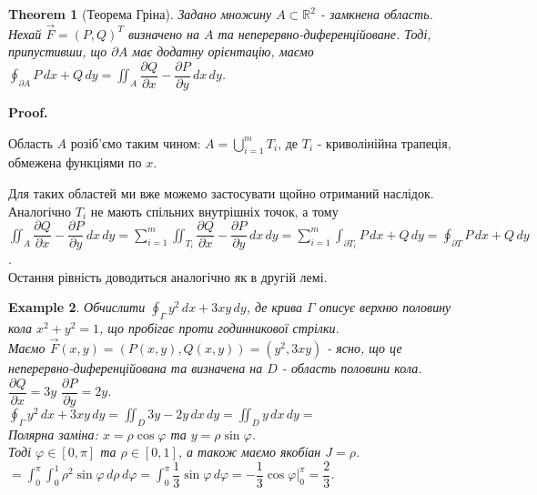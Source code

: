\documentclass[a4paper, 10pt]{article}
\makeatletter
\def\departial#1#2{\dfrac{\partial {#1}}{\partial {#2}}}
\def\qed{$\blacksquare$}
\theoremstyle{theoremdd}
\newtheorem{theorem}{Theorem}[subsection]
\theoremstyle{theoremdd}
\theoremstyle{theoremdd}
\theoremstyle{theoremdd}
\newtheorem{example}[theorem]{Example}
\theoremstyle{theoremdd}
\theoremstyle{theoremdd}
\theoremstyle{theoremdd}
\theoremstyle{theoremdd}
\renewenvironment{proof}[1][Proof.\\]{\par
\pushQED{\hfill \qed}%
\normalfont \topsep6\p@\@plus6\p@\relax
\trivlist
\item\relax
{\bfseries
#1\@addpunct{.}}\hspace\labelsep\ignorespaces
}{%
\popQED\endtrivlist\@endpefalse
}
\makeatother
\begin{document}
\begin{theorem}[Теорема Гріна]
Задано множину $A \subset \mathbb{R}^2$ - замкнена область. Нехай $\vec{F} = (P,Q)^T$ визначено на $A$ та неперервно-диференційоване. Тоді, припустивши, що $\partial A$ має додатну орієнтацію, маємо\\
$\displaystyle\oint_{\partial A} P\,dx + Q\,dy = \iint_A \departial{Q}{x} - \departial{P}{y}\,dx\,dy$.
\end{theorem}

\begin{proof}
Область $A$ розіб'ємо таким чином:  $A = \displaystyle\bigcup_{i=1}^m T_i$, де $T_i$ - криволінійна трапеція, обмежена функціями по $x$.
\begin{figure}[H]
\centering
{}
\end{figure}
Для таких областей ми вже можемо застосувати щойно отриманий наслідок.\\
Аналогічно $T_i$ не мають спільних внутрішніх точок, а тому\\
$\displaystyle\iint_A \departial{Q}{x} - \departial{P}{y}\,dx\,dy = \sum_{i=1}^m \iint_{T_i} \departial{Q}{x} - \departial{P}{y}\,dx\,dy = \sum_{i=1}^m \int_{\partial T_i} P\,dx+Q\,dy = \oint_{\partial T} P\,dx + Q\,dy$.\\
Остання рівність доводиться аналогічно як в другій лемі.
\end{proof}

\begin{example}
Обчислити $\displaystyle\oint_\Gamma y^2\,dx + 3xy\,dy$, де крива $\Gamma$ описує верхню половину кола $x^2+y^2 = 1$, що пробігає проти годинникової стрілки.\\
Маємо $\vec{F}(x,y) = (P(x,y),Q(x,y)) = (y^2,3xy)$ - ясно, що це неперервно-диференційована та визначена на $D$ - область половини кола.\\
$\departial{Q}{x} = 3y$ \hspace{1cm} $\departial{P}{y} = 2y$.\\
$\displaystyle\oint_\Gamma y^2\,dx + 3xy\,dy = \iint_D 3y - 2y\,dx\,dy = \iint_D y\,dx\,dy =$\\
Полярна заміна: $x = \rho \cos \varphi$ та $y = \rho \sin \varphi$.\\
Тоді $\varphi \in [0,\pi]$ та $\rho \in [0,1]$, а також маємо якобіан $J = \rho$.\\
$= \displaystyle\int_0^{\pi} \int_0^1 \rho^2 \sin \varphi \,d\rho\,d\varphi = \int_0^{\pi} \dfrac{1}{3} \sin \varphi\,d\varphi = -\dfrac{1}{3} \cos \varphi\Big|_{0}^{\pi} = \dfrac{2}{3}$.
\end{example}
\end{document}
